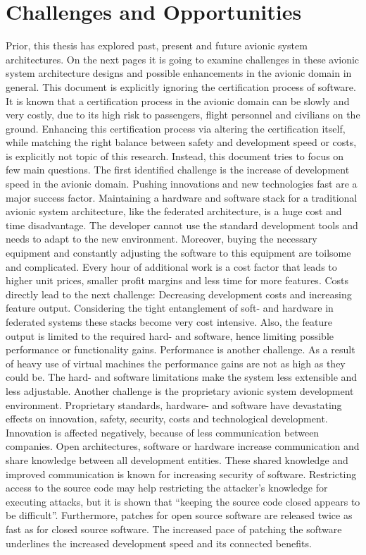\documentclass[titlepage]{report}
\begin{document}
\section{Challenges and Opportunities}\label{section:Challenges_And_Opportunities}
Prior, this thesis has explored past, present and future avionic system architectures. On the next pages it is going to examine
challenges in these avionic system architecture designs and possible enhancements in the avionic domain in general. This document is explicitly ignoring the certification
process of software. It is known that a certification process in the avionic domain can be slowly and very costly, due to its
high risk to passengers, flight personnel and civilians on the ground. Enhancing this certification process via altering the certification itself, while matching the right balance between safety
and development speed or costs, is explicitly not topic of this research. Instead, this document tries to focus on few main questions.
The first identified challenge is the increase of development speed in the avionic domain. Pushing innovations and new technologies fast are a major
success factor. Maintaining a hardware and software stack for a traditional avionic system architecture, like the federated architecture, is a
huge cost and time disadvantage. The developer cannot use the standard development tools and needs to adapt to the new environment. Moreover,
buying the necessary equipment and constantly adjusting the software to this equipment are toilsome and complicated. Every hour of additional
work is a cost factor that leads to higher unit prices, smaller profit margins and less time for more features. Costs directly lead to the next
challenge: Decreasing development costs and increasing feature output. Considering the tight entanglement of soft- and hardware in federated systems
these stacks become very cost intensive. Also, the feature output is limited to the required hard- and software,
hence limiting possible performance or functionality gains. Performance is another challenge. As a result of heavy use of virtual machines the performance
gains are not as high as they could be. The hard- and software limitations make the system less extensible and less adjustable. Another challenge is the
proprietary avionic system development environment. Proprietary standards, hardware- and software have devastating effects on innovation, safety, security,
costs and technological development. Innovation is affected negatively, because of less communication between companies. Open architectures, software or hardware
increase communication and share knowledge between all development entities. These shared knowledge and improved communication is known for increasing
security of software\cite{hoepman2007increased}. Restricting access to the source code may help restricting the attacker's knowledge for executing attacks, but it is shown that
``keeping the source code closed appears to be difficult''\cite{mercuri2003security}. Furthermore, patches for open source software are released twice as fast
as for closed source software\cite{witten2001does}. The increased pace of patching the software underlines the increased development speed and its connected
benefits.
\end{document}
